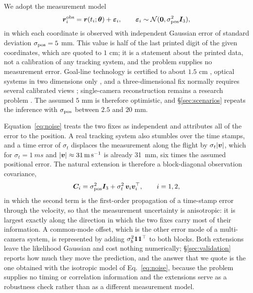 We adopt the measurement model
\begin{equation}
  \bm{r}_i^{\rm obs}=\bm{r}(t_i;\bm{\theta})+\bm{\varepsilon}_i,
  \qquad
  \bm{\varepsilon}_i\sim\mathcal N(\bm{0},\sigma_{\rm pos}^2\bm{I}_3),
  \label{eq:noise}
\end{equation}
in which each coordinate is observed with independent Gaussian error of standard
deviation $\sigma_{\rm pos}=5$ mm. This value is half of the last printed digit
of the given coordinates, which are quoted to $1$ cm; it is a statement about the
printed data, not a calibration of any tracking system, and the problem supplies
no measurement error. Goal-line technology is certified to about $1.5$ cm
\citep{fifa2020glt}, optical systems in two dimensions only
\citep{fifa2025epts}, and a three-dimensional fix normally requires several
calibrated views \citep{hawkeye_glt}; single-camera reconstruction remains a
research problem \citep{vorobev2025}. The assumed $5$ mm is therefore
optimistic, and \S\ref{sec:scenarios} repeats the inference with
$\sigma_{\rm pos}$ between $2.5$ and $20$ mm.

Equation~\eqref{eq:noise} treats the two fixes as independent and attributes all
of the error to the position. A real tracking system also stumbles over the
time stamps, and a time error of $\sigma_t$ displaces the measurement along the
flight by $\sigma_t|\bm{v}|$, which for $\sigma_t=\SI{1}{ms}$ and
$|\bm{v}|\approx\SI{31}{m\,s^{-1}}$ is already \SI{31}{mm}, six times the
assumed positional error. The natural extension is therefore a block-diagonal
observation covariance,
\begin{equation}
  \bm{C}_i=\sigma_{\rm pos}^2\bm{I}_3+\sigma_t^2\,\bm{v}_i\bm{v}_i^{\top},
  \qquad i=1,2,
  \label{eq:cov}
\end{equation}
in which the second term is the first-order propagation of a time-stamp error
through the velocity, so that the measurement uncertainty is anisotropic: it is
largest exactly along the direction in which the two fixes carry most of their
information. A common-mode offset, which is the other error mode of a
multi-camera system, is represented by adding
$\sigma_b^2\bm{1}\bm{1}^{\top}$ to both blocks. Both extensions leave the
likelihood Gaussian and cost nothing numerically; \S\ref{sec:validation}
reports how much they move the prediction, and the answer that we quote is the
one obtained with the isotropic model of Eq.~\eqref{eq:noise}, because the
problem supplies no timing or correlation information and the extensions serve
as a robustness check rather than as a different measurement model.

